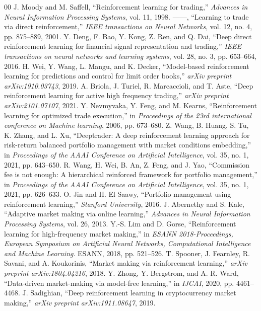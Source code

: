 \documentclass[conference]{IEEEtran}
\begin{document}
\begin{thebibliography}{00}
 J. Moody and M. Saffell, ``Reinforcement learning for trading,'' \textit{Advances in Neural Information Processing Systems}, vol. 11, 1998.
 ------, ``Learning to trade via direct reinforcement,'' \textit{IEEE transactions on Neural Networks}, vol. 12, no. 4, pp. 875--889, 2001.
 Y. Deng, F. Bao, Y. Kong, Z. Ren, and Q. Dai, ``Deep direct reinforcement learning for financial signal representation and trading,'' \textit{IEEE transactions on neural networks and learning systems}, vol. 28, no. 3, pp. 653--664, 2016.
 H. Wei, Y. Wang, L. Mangu, and K. Decker, ``Model-based reinforcement learning for predictions and control for limit order books,'' \textit{arXiv preprint arXiv:1910.03743}, 2019.
 A. Briola, J. Turiel, R. Marcaccioli, and T. Aste, ``Deep reinforcement learning for active high frequency trading,'' \textit{arXiv preprint arXiv:2101.07107}, 2021.
 Y. Nevmyvaka, Y. Feng, and M. Kearns, ``Reinforcement learning for optimized trade execution,'' in \textit{Proceedings of the 23rd international conference on Machine learning}, 2006, pp. 673--680.
 Z. Wang, B. Huang, S. Tu, K. Zhang, and L. Xu, ``Deeptrader: A deep reinforcement learning approach for risk-return balanced portfolio management with market conditions embedding,'' in \textit{Proceedings of the AAAI Conference on Artificial Intelligence}, vol. 35, no. 1, 2021, pp. 643--650.
 R. Wang, H. Wei, B. An, Z. Feng, and J. Yao, ``Commission fee is not enough: A hierarchical reinforced framework for portfolio management,'' in \textit{Proceedings of the AAAI Conference on Artificial Intelligence}, vol. 35, no. 1, 2021, pp. 626--633.
 O. Jin and H. El-Saawy, ``Portfolio management using reinforcement learning,'' \textit{Stanford University}, 2016.
 J. Abernethy and S. Kale, ``Adaptive market making via online learning,'' \textit{Advances in Neural Information Processing Systems}, vol. 26, 2013.
 Y.-S. Lim and D. Gorse, ``Reinforcement learning for high-frequency market making,'' in \textit{ESANN 2018-Proceedings, European Symposium on Artificial Neural Networks, Computational Intelligence and Machine Learning}. ESANN, 2018, pp. 521--526.
 T. Spooner, J. Fearnley, R. Savani, and A. Koukorinis, ``Market making via reinforcement learning,'' \textit{arXiv preprint arXiv:1804.04216}, 2018.
 Y. Zhong, Y. Bergstrom, and A. R. Ward, ``Data-driven market-making via model-free learning,'' in \textit{IJCAI}, 2020, pp. 4461--4468.
 J. Sadighian, ``Deep reinforcement learning in cryptocurrency market making,'' \textit{arXiv preprint arXiv:1911.08647}, 2019.

\end{thebibliography}
\end{document}
